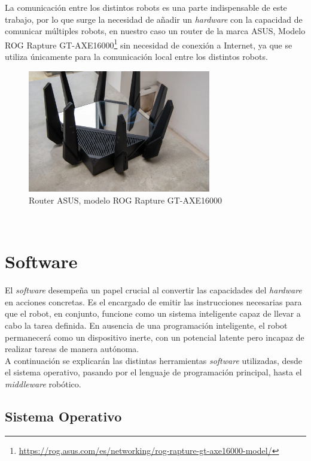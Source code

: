 La comunicación entre los distintos robots es una parte indispensable de este
trabajo, por lo que surge la necesidad de añadir un \textit{hardware} con la
capacidad de comunicar múltiples robots, en nuestro caso un router de la marca
ASUS, Modelo ROG Rapture
GT-AXE16000\footnote{\url{https://rog.asus.com/es/networking/rog-rapture-gt-axe16000-model/}}
sin necesidad de conexión a Internet, ya que se utiliza únicamente para la
comunicación local entre los distintos robots.
\\

\begin{figure} [h!]
  \begin{center}
    \includegraphics[width=8cm]{figs/asus_router}
  \end{center}
  \caption{Router ASUS, modelo ROG Rapture GT-AXE16000 \citep{asus_router}}
  \label{fig:asus_router}
\end{figure}\


\section{Software}
\label{sec:software}

El \textit{software} desempeña un papel crucial al convertir las capacidades del
\textit{hardware} en acciones concretas.
Es el encargado de emitir las instrucciones necesarias para que el robot, en
conjunto, funcione como un sistema inteligente capaz de llevar a cabo la tarea
definida.
En ausencia de una programación inteligente, el robot permanecerá como un
dispositivo inerte, con un potencial latente pero incapaz de realizar tareas de
manera autónoma.
\\

A continuación se explicarán las distintas herramientas \textit{software}
utilizadas, desde el sistema operativo, pasando por el lenguaje de programación
principal, hasta el \textit{middleware} robótico.
\\


\subsection{Sistema Operativo}
\label{sec:sistema_operativo}

